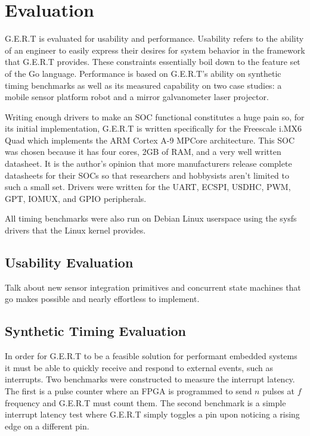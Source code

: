 \chapter{Evaluation}

G.E.R.T is evaluated for usability and performance. Usability refers to the
ability of an engineer to easily express their desires for system behavior
in the framework that G.E.R.T provides. These constraints essentially
boil down to the feature set of the Go language. Performance is based on
G.E.R.T's ability on synthetic timing benchmarks as well as its measured
capability on two case studies: a mobile sensor platform robot and a mirror
galvanometer laser projector.

Writing enough drivers to make an SOC functional constitutes a huge pain so,
for its initial implementation, G.E.R.T is written specifically for the
Freescale i.MX6 Quad which implements the ARM Cortex A-9 MPCore architecture.
This SOC was chosen because it has four cores, 2GB of RAM, and a very well
written datasheet. It is the author's opinion that more manufacturers release
complete datasheets for their SOCs so that researchers and hobbysists
aren't limited to such a small set. Drivers were written for the UART, ECSPI, USDHC,
PWM, GPT, IOMUX, and GPIO peripherals.

All timing benchmarks were also run on Debian Linux userspace using the sysfs
drivers that the Linux kernel provides. 


\section{Usability Evaluation}

Talk about new sensor integration primitives and concurrent
state machines that go makes possible and nearly effortless to
implement.


\section{Synthetic Timing Evaluation}\label{ch1:opts}

In order for G.E.R.T to be a feasible solution for performant embedded systems it
must be able to quickly receive and respond to external events, such as interrupts.
Two benchmarks were constructed to measure the interrupt latency. The first is a pulse
counter where an FPGA is programmed to send $n$ pulses at $f$ frequency and G.E.R.T must
count them. The second benchmark is a simple interrupt latency test where G.E.R.T simply
toggles a pin upon noticing a rising edge on a different pin.


